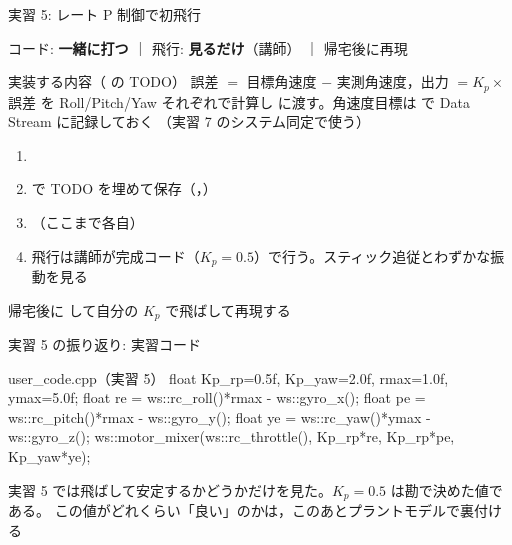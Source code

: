
\begin{frame}[fragile]{実習 5: レート P 制御で初飛行}
  \vspace{0.15em}

  {\footnotesize コード: \textcolor{sfblue}{\textbf{一緒に打つ}} ｜ 飛行: \textcolor{sfblue}{\textbf{見るだけ}}（講師） ｜ 帰宅後に再現}

  \vspace{0.3em}

  \begin{block}{実装する内容（ の TODO）}\footnotesize
    誤差 $=$ 目標角速度 $-$ 実測角速度，出力 $=K_p\times$誤差 を Roll/Pitch/Yaw
    それぞれで計算し  に渡す。角速度目標は
     で Data Stream に記録しておく
    （実習 7 のシステム同定で使う）
  \end{block}

  \begin{enumerate}\footnotesize\setlength{\itemsep}{0pt}
    \item {}
    \item {} で TODO を埋めて保存（，）
    \item {}（ここまで各自）
    \item 飛行は講師が完成コード（$K_p=0.5$）で行う。スティック追従とわずかな振動を見る
  \end{enumerate}

  {\footnotesize 帰宅後に  して自分の $K_p$ で飛ばして再現する}
\end{frame}

\begin{frame}[fragile]{実習 5 の振り返り: 実習コード}
  \begin{sflisting}[basicstyle=\ttfamily\scriptsize]{user\_code.cpp（実習 5）}
float Kp_rp=0.5f, Kp_yaw=2.0f, rmax=1.0f, ymax=5.0f;
float re = ws::rc_roll()*rmax  - ws::gyro_x();
float pe = ws::rc_pitch()*rmax - ws::gyro_y();
float ye = ws::rc_yaw()*ymax   - ws::gyro_z();
ws::motor_mixer(ws::rc_throttle(),
    Kp_rp*re, Kp_rp*pe, Kp_yaw*ye);
  \end{sflisting}

  \vspace{0.5em}

  {\footnotesize 実習 5 では飛ばして安定するかどうかだけを見た。$K_p=0.5$ は勘で決めた値である。
  この値がどれくらい「良い」のかは，このあとプラントモデルで裏付ける}
\end{frame}

